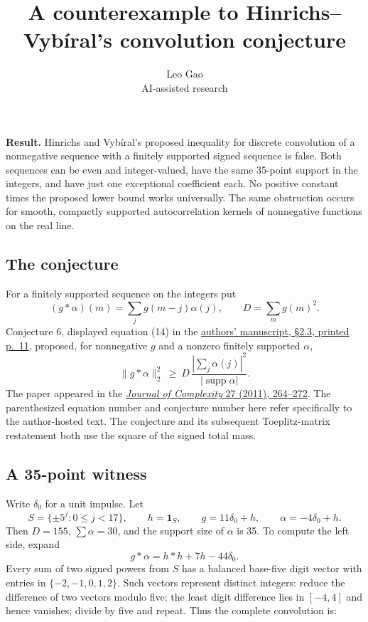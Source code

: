 \documentclass[11pt]{article}
\title{A counterexample to Hinrichs--Vyb\'iral's convolution conjecture}
\author{Leo Gao\\\small AI-assisted research}
\date{}
\begin{document}
\maketitle
\textbf{Result.} Hinrichs and Vybíral's proposed inequality for discrete convolution of a nonnegative sequence with a finitely supported signed sequence is false. Both sequences can be even and integer-valued, have the same 35-point support in the integers, and have just one exceptional coefficient each. No positive constant times the proposed lower bound works universally. The same obstruction occurs for smooth, compactly supported autocorrelation kernels of nonnegative functions on the real line.

\subsection{The conjecture}\label{the-conjecture}

For a finitely supported sequence on the integers put \[
 (g*\alpha)(m)=\sum_j g(m-j)\alpha(j),\qquad D=\sum_m g(m)^2.
\] Conjecture 6, displayed equation (14) in the \href{https://kmlinux.fjfi.cvut.cz/~vybirja2/publ/Vybiral19.pdf\#page=11}{authors' manuscript, §2.3, printed p.~11}, proposed, for nonnegative \(g\) and a nonzero finitely supported \(\alpha\), \[
 \|g*\alpha\|_2^2 \ \ge\  D\,\frac{|\sum_j\alpha(j)|^2}{|\operatorname{supp}\alpha|}.
 \tag{C6}
\] The paper appeared in the \href{https://doi.org/10.1016/j.jco.2011.01.002}{\emph{Journal of Complexity} 27 (2011), 264--272}. The parenthesized equation number and conjecture number here refer specifically to the author-hosted text. The conjecture and its subsequent Toeplitz-matrix restatement both use the square of the signed total mass.

\subsection{A 35-point witness}\label{a-35-point-witness}

Write \(\delta_0\) for a unit impulse. Let \[
 S=\{\pm5^j:0\le j<17\},\qquad h=\mathbf1_S,\qquad
 g=11\delta_0+h,\qquad \alpha=-4\delta_0+h.
\] Then \(D=155\), \(\sum\alpha=30\), and the support size of \(\alpha\) is 35. To compute the left side, expand \[
 g*\alpha=h*h+7h-44\delta_0.
\] Every sum of two signed powers from \(S\) has a balanced base-five digit vector with entries in \(\{-2,-1,0,1,2\}\). Such vectors represent distinct integers: reduce the difference of two vectors modulo five; the least digit difference lies in \([-4,4]\) and hence vanishes; divide by five and repeat. Thus the complete convolution is:
\end{document}
